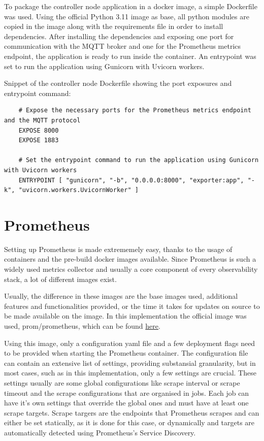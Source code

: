 To package the controller node application in a docker image, a simple Dockerfile was used. Using the official Python 3.11 image as base, all python modules are copied in the image along with the requirements file in order to install dependencies. After installing the dependencies and exposing one port for communication with the MQTT broker and one for the Prometheus metrics endpoint, the application is ready to run inside the container. An entrypoint was set to run the application using Gunicorn with Uvicorn workers.

Snippet of the controller node Dockerfile showing the port exposures and entrypoint command:
\begin{verbatim}
    # Expose the necessary ports for the Prometheus metrics endpoint and the MQTT protocol
    EXPOSE 8000
    EXPOSE 1883

    # Set the entrypoint command to run the application using Gunicorn with Uvicorn workers
    ENTRYPOINT [ "gunicorn", "-b", "0.0.0.0:8000", "exporter:app", "-k", "uvicorn.workers.UvicornWorker" ]
\end{verbatim}

\section{Prometheus}
Setting up Prometheus is made extrememely easy, thanks to the usage of containers and the pre-build docker images available. Since Prometheus is such a widely used metrics collector and usually a core component of every observability stack, a lot of different images exist.

Usually, the difference in these images are the base images used, additional features and functionalities provided, or the time it takes for updates on source to be made available on the image. In this implementation the official image was used, prom/prometheus, which can be found \href{https://hub.docker.com/r/prom/prometheus}{here}.

Using this image, only a configuration yaml file and a few deployment flags need to be provided when starting the Prometheus container. The configuration file can contain an extensive list of settings, providing substansial granularity, but in most cases, such as in this implementation, only a few settings are crucial. These settings usually are some global configurations like scrape interval or scrape timeout and the scrape configurations that are organised in jobs. Each job can have it's own settings that override the global ones and must have at least one scrape targets. Scrape targers are the endpoints that Prometheus scrapes and can either be set statically, as it is done for this case, or dynamically and targets are automatically detected using Prometheus's Service Discovery.

